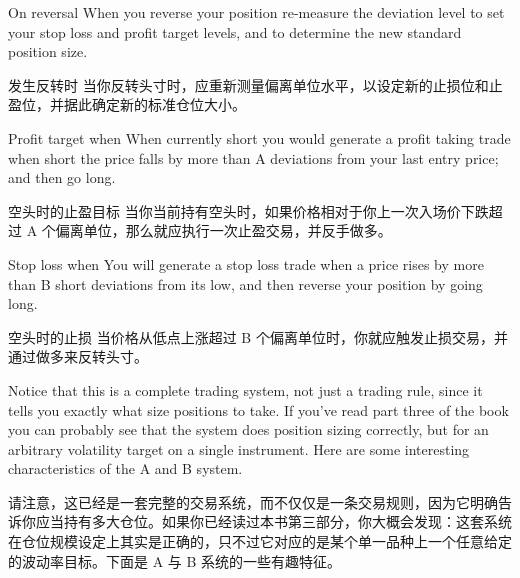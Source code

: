 \bipairgap

\begin{englishblock} On reversal When you reverse your position re-measure the deviation level to set your stop loss and profit target levels, and to determine the new standard position size. \end{englishblock}

\begin{chineseblock}发生反转时 当你反转头寸时，应重新测量偏离单位水平，以设定新的止损位和止盈位，并据此确定新的标准仓位大小。\end{chineseblock}

\bipairgap

\begin{englishblock} Profit target when When currently short you would generate a profit taking trade when short the price falls by more than A deviations from your last entry price; and then go long. \end{englishblock}

\begin{chineseblock}空头时的止盈目标 当你当前持有空头时，如果价格相对于你上一次入场价下跌超过 A 个偏离单位，那么就应执行一次止盈交易，并反手做多。\end{chineseblock}

\bipairgap

\begin{englishblock} Stop loss when You will generate a stop loss trade when a price rises by more than B short deviations from its low, and then reverse your position by going long. \end{englishblock}

\begin{chineseblock}空头时的止损 当价格从低点上涨超过 B 个偏离单位时，你就应触发止损交易，并通过做多来反转头寸。\end{chineseblock}

\bipairgap

\begin{englishblock} Notice that this is a complete trading system, not just a trading rule, since it tells you exactly what size positions to take. If you've read part three of the book you can probably see that the system does position sizing correctly, but for an arbitrary volatility target on a single instrument. Here are some interesting characteristics of the A and B system. \end{englishblock}

\begin{chineseblock}请注意，这已经是一套完整的交易系统，而不仅仅是一条交易规则，因为它明确告诉你应当持有多大仓位。如果你已经读过本书第三部分，你大概会发现：这套系统在仓位规模设定上其实是正确的，只不过它对应的是某个单一品种上一个任意给定的波动率目标。下面是 A 与 B 系统的一些有趣特征。\end{chineseblock}

